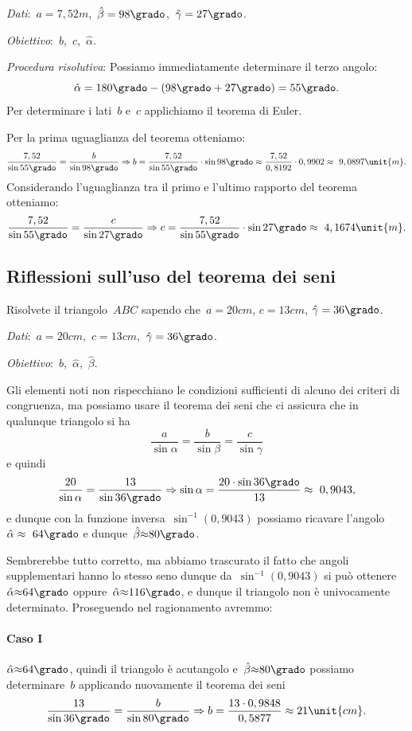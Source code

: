 \emph{Dati}:~$a= 
7,52\unit{m}$,\quad~$\hat{\beta}=98\grado$,\quad~${\hat{\gamma}}=27\grado$.

\emph{Obiettivo}:~$b$,\quad~$c$,\quad~$\hat{\alpha}$.

\emph{Procedura risolutiva}:
Possiamo immediatamente determinare il terzo angolo: 
\[{\hat{\alpha}}=180\grado-(98\grado+27\grado)=55\grado.\]
Per determinare i lati~$b$ e~$c$ applichiamo il teorema di Euler.

Per la prima uguaglianza del teorema otteniamo:
\[
\frac{7,52}{\sin 55\grado}=\frac{b}{\sin 98\grado} \Rightarrow 
b=\frac{7,52}{\sin 55\grado}\cdot \sin 98\grado\approx
\frac{7,52}{0,8192}\cdot 0,9902\approx~9,0897\unit{m}.
\]
Considerando l'uguaglianza tra il primo e l'ultimo rapporto del teorema 
otteniamo:
\[
\frac{7,52}{\sin 55\grado}=\frac{c}{\sin 27\grado} \Rightarrow 
c=\frac{7,52}{\sin 55\grado}\cdot \sin 27\grado\approx~4,1674\unit{m}.
\]
\subsection{Riflessioni sull'uso del teorema dei seni}
\begin{problema}
Risolvete il triangolo~$ABC$ sapendo che~$a= 20\unit{cm}$, $c= 13\unit{cm}$, 
${\hat{\gamma}}=36\grado$.
\end{problema}

\emph{Dati}:~$a= 20\unit{cm}$,\quad~$c= 
13\unit{cm}$,\quad~${\hat{\gamma}}=36\grado$.

\emph{Obiettivo}:~$b$,\quad~$\hat{\alpha}$,\quad~$\hat{\beta}$.

Gli elementi noti non rispecchiano le condizioni sufficienti di alcuno dei 
criteri di congruenza, ma possiamo usare il teorema dei seni
che ci assicura che in qualunque triangolo si ha
 \[\frac{a}{\sin \alpha}=\frac{b}{\sin \beta}=\frac{c}{\sin \gamma}\]
e quindi
\[\frac{20}{\sin \alpha}=\frac{13}{\sin 36\grado}\Rightarrow\sin 
\alpha=\frac{20\cdot\sin 36\grado}{13}\approx~0,9043,\]
e dunque con la funzione inversa~$\sin^{-1}(0,9043)$ possiamo ricavare 
l'angolo~${\hat{\alpha}}\approx~64\grado$ e 
dunque~${\hat{\beta}}{\approx}80\grado$.

Sembrerebbe tutto corretto, ma abbiamo trascurato il fatto che angoli 
supplementari hanno lo stesso seno dunque
da~$\sin ^{-1}(0,9043)$ si può ottenere~${\hat{\alpha}}{\approx} 64\grado$ 
oppure~${\hat{\alpha}}{\approx}116\grado$,
e dunque il triangolo non è univocamente determinato. Proseguendo nel 
ragionamento avremmo:
\paragraph{Caso I}
${\hat{\alpha}}{\approx}64\grado$, quindi il triangolo è acutangolo 
e~${\hat{\beta}}{\approx} 80\grado$ possiamo determinare~$b$ applicando 
nuovamente
il teorema dei seni
\[\frac{13}{\sin 36\grado}=\frac{b}{\sin 80\grado}\Rightarrow 
b=\frac{13\cdot0,9848}{0,5877}\approx21\unit{cm}.\]
